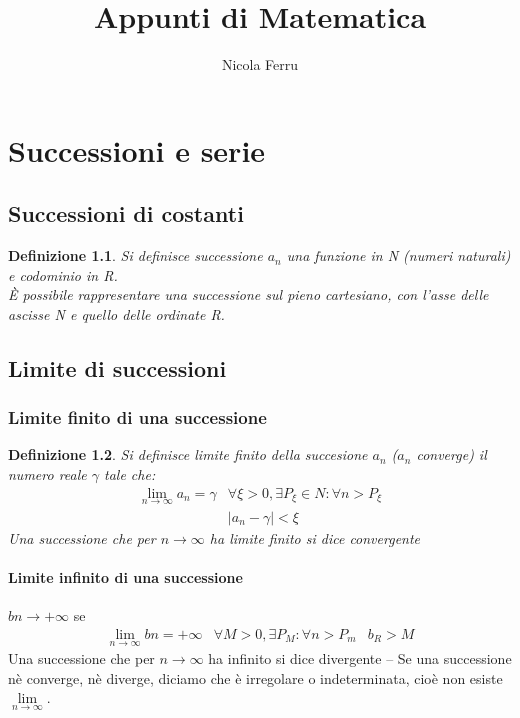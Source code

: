 \documentclass{book}
\title{Appunti di Matematica}
\author{Nicola Ferru}
\date{}
\newtheorem{defi}{Definizione}
\newcommand{\abs}[1]{\lvert#1\rvert}
\begin{document}


\tableofcontents
\listoffigures







\chapter{Successioni e serie}
\section{Successioni di costanti}
\begin{defi}
  Si definisce successione $a_n$ una funzione in N (numeri naturali) e codominio in R.\\
  È possibile rappresentare una successione sul pieno cartesiano, con l'asse delle
  ascisse N e quello delle ordinate R.
\end{defi}

\section{Limite di successioni}
\subsection{Limite finito di una successione}
\begin{defi}
  Si definisce limite finito della succesione $a_n$ ($a_n$ converge) il numero reale
  $\gamma$ tale che:
  \begin{eqnarray*}
    \lim_{n\to \infty} a_n=\gamma & \forall \xi >0, \exists P_\xi \in N:\forall n > P_\xi\\
                                  & \abs{a_n-\gamma} < \xi
  \end{eqnarray*}
  Una successione che per $n\to \infty$ ha limite finito si dice {\color{red}convergente}
\end{defi}
\subsubsection{Limite infinito di una successione}
$bn\to +\infty$ se
\begin{eqnarray*}
  \lim_{n\to\infty}bn=+\infty & \forall M>0, \exists P_M:\forall n > P_m & b_R>M
\end{eqnarray*}
Una successione che per $n\to \infty$ ha infinito si dice {\color{red}divergente} --
Se una successione nè converge, nè diverge, diciamo che è {\color{red}irregolare} o
{\color{red}indeterminata}, cioè non esiste $\lim\limits_{n\to\infty}$.
\end{document}
